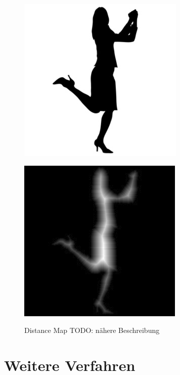\begin{figure}[h]
	\centering
	\begin{minipage}{5cm}
		\centering
		\includegraphics[width=1.0\linewidth]{./fig/person.jpg}
		\label{fig:beispiel_person}
	\end{minipage}
	\hspace{3cm}
	\begin{minipage}{5cm}
		\centering
		\includegraphics[width=1.0\linewidth]{./fig/distance_map_beispiel}
		\label{fig:distance_map_beispiel}
	\end{minipage}
	\caption{Distance Map TODO: nähere Beschreibung}
\end{figure}
\section{Weitere Verfahren}
